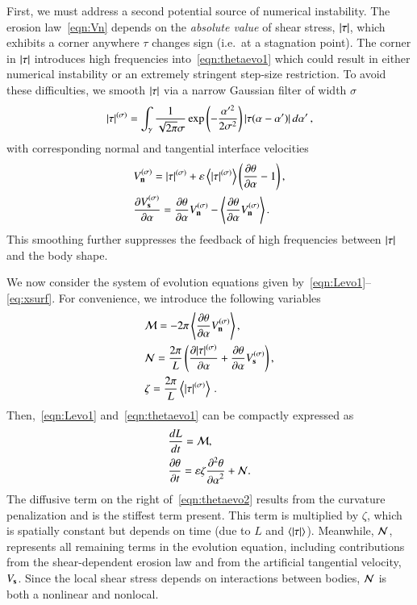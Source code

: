 \documentclass[preprint, 10pt]{elsarticle}
\begin{document}
First, we must address a second potential source of numerical
instability. The erosion law~\eqref{eqn:Vn} depends on the {\em absolute
value} of shear stress, $\lvert \tau \rvert$, which exhibits a corner anywhere $\tau$
changes sign (i.e.~at a stagnation point). The corner in $\lvert \tau \rvert$
introduces high frequencies into~\eqref{eqn:thetaevo1} which could result in either numerical instability or an extremely stringent step-size restriction. To avoid these difficulties, we smooth $\lvert \tau \rvert$ via a narrow Gaussian filter of width $\sigma$
\begin{align}
\lvert \tau \rvert^{(\sigma)} = \int_{\gamma} \frac{1}{\sqrt{2\pi} \sigma}
 \exp \left(- \frac{\alpha'^2}{2 \sigma^2}\right) \lvert  \tau(\alpha - \alpha')  \rvert \, d\alpha' \, ,
\end{align}
with corresponding normal and tangential interface velocities
\begin{align}
& V_{\mathbf{n}}^{(\sigma)} = \lvert \tau \rvert^{(\sigma)} +  \varepsilon \left< \lvert \tau \rvert^{(\sigma)} \right>
\left(\frac{\partial \theta}{\partial \alpha} - 1 \right), \\
& \frac{\partial V_{\mathbf{s}}^{(\sigma)}}{\partial \alpha} = \frac{\partial \theta}{\partial \alpha} V_{\mathbf{n}}^{(\sigma)} - \left< \frac{\partial \theta}{\partial \alpha} V_{\mathbf{n}}^{(\sigma)} \right>.
\end{align}
This smoothing further suppresses the feedback of high frequencies between $\lvert \tau \rvert$ and the body shape.

We now consider the system of evolution equations given by~\eqref{eqn:Levo1}--\eqref{eq:xsurf}. For convenience, we introduce the following variables
\begin{align}
& \mathcal{M} = - 2 \pi \left< \frac{\partial \theta}{\partial \alpha} V_{\mathbf{n}}^{(\sigma)} \right>, \\
& \mathcal{N} = \frac{2 \pi}{L} \left( \frac{\partial \lvert \tau \rvert^{(\sigma)}}{\partial \alpha} + \frac{\partial \theta}{\partial \alpha}
V_{\mathbf{s}}^{(\sigma)} \right), \\
& \zeta = \frac{2 \pi}{L}  \left< \lvert \tau \rvert^{(\sigma)} \right> \, .
\end{align}
Then,~\eqref{eqn:Levo1} and~\eqref{eqn:thetaevo1} can be compactly expressed as
\begin{align}
\label{eqn:Levo2}
& \frac{d L}{d t} = \mathcal{M}, \\
\label{eqn:thetaevo2}
& \frac{\partial \theta}{\partial t} = \varepsilon \zeta \frac{\partial^2 \theta}{{\partial \alpha}^2} + \mathcal{N}.
\end{align}
The diffusive term on the right of~\eqref{eqn:thetaevo2} results from the curvature penalization and is the stiffest term present. This term is multiplied by $\zeta$, which is spatially constant but depends on time (due to $L$ and $\left< \lvert \tau \rvert \right>$). Meanwhile, $\mathcal{N}$, represents all remaining terms in the evolution equation, including contributions from the shear-dependent erosion law and from the artificial tangential velocity, $V_{\mathbf{s}}$. Since the local shear stress depends on interactions between bodies, $\mathcal{N}$ is both a nonlinear and nonlocal.
\end{document}
